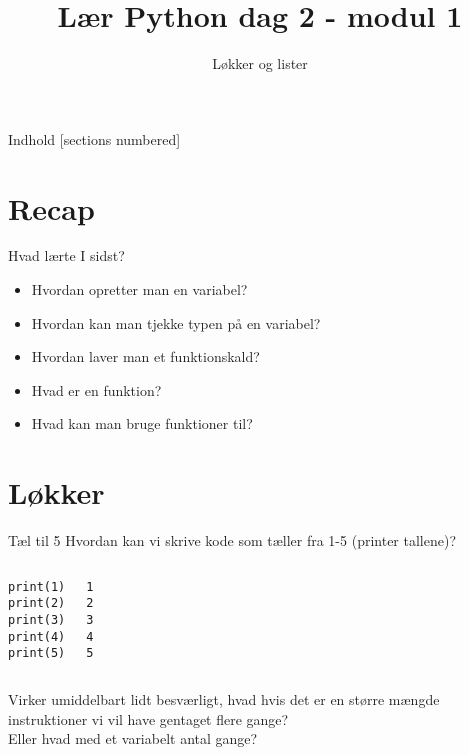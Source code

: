 

\title{Lær Python dag 2 - modul 1}
\subtitle{Løkker og lister}



\maketitle

\begin{frame}{Indhold}
  [sections numbered]
  \tableofcontents[hideallsubsections]
\end{frame}

\section{Recap}
\begin{frame}[fragile]{Hvad lærte I sidst?}
	\begin{itemize}
		\item Hvordan opretter man en variabel?
		\item Hvordan kan man tjekke typen på en variabel?
		\item Hvordan laver man et funktionskald?
		\item Hvad er en funktion?
		\item Hvad kan man bruge funktioner til?
	\end{itemize}
\end{frame}

\section{Løkker}

\begin{frame}[fragile]{Tæl til 5}
	Hvordan kan vi skrive kode som tæller fra 1-5 (printer tallene)?
	\pause
	\begin{columns}
		\begin{lstlisting}[style=python]
print(1)
print(2)
print(3)
print(4)
print(5)
		\end{lstlisting}
		\begin{lstlisting}[style=python]
1
2
3
4
5
		\end{lstlisting}
	\end{columns}
	Virker umiddelbart lidt besværligt, hvad hvis det er en større mængde instruktioner vi vil have gentaget flere gange?\\
	Eller hvad med et variabelt antal gange?
\end{frame}

